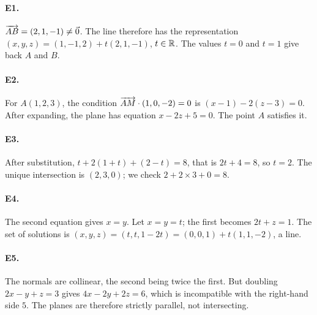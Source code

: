 \paragraph{E1.}$\overrightarrow{AB}=(2,1,-1)\ne\vec0$. The line therefore has the representation $(x,y,z)=(1,-1,2)+t(2,1,-1)$, $t\in\mathbb R$. The values $t=0$ and $t=1$ give back $A$ and $B$.

\paragraph{E2.}For $A(1,2,3)$, the condition $\overrightarrow{AM}\cdot(1,0,-2)=0$ is $(x-1)-2(z-3)=0$. After expanding, the plane has equation $x-2z+5=0$. The point $A$ satisfies it.

\paragraph{E3.}After substitution, $t+2(1+t)+(2-t)=8$, that is $2t+4=8$, so $t=2$. The unique intersection is $(2,3,0)$; we check $2+2\times3+0=8$.

\paragraph{E4.}The second equation gives $x=y$. Let $x=y=t$; the first becomes $2t+z=1$. The set of solutions is $(x,y,z)=(t,t,1-2t)=(0,0,1)+t(1,1,-2)$, a line.

\paragraph{E5.}The normals are collinear, the second being twice the first. But doubling $2x-y+z=3$ gives $4x-2y+2z=6$, which is incompatible with the right-hand side $5$. The planes are therefore strictly parallel, not intersecting.


